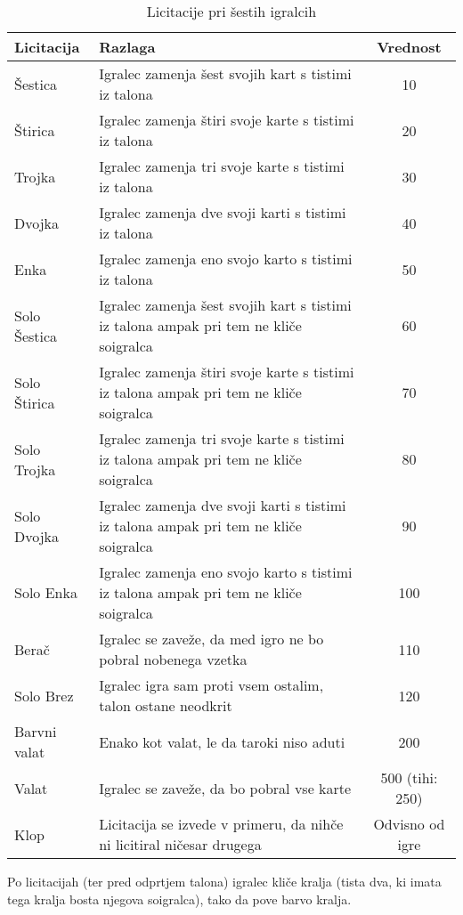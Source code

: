 \documentclass[a4paper, ]{report}
\begin{document}
\begin{table}
  \caption{Licitacije pri šestih igralcih}
  \begin{tabularx}{\textwidth}{lXc}
    \toprule
    \textbf{Licitacija} & \textbf{Razlaga} & \textbf{Vrednost} \\ \toprule
    Šestica & Igralec zamenja šest svojih kart s tistimi iz talona & 10 \\ \hline
    Štirica & Igralec zamenja štiri svoje karte s tistimi iz talona & 20 \\ \hline
    Trojka & Igralec zamenja tri svoje karte s tistimi iz talona & 30 \\ \hline
    Dvojka & Igralec zamenja dve svoji karti s tistimi iz talona & 40 \\ \hline
    Enka & Igralec zamenja eno svojo karto s tistimi iz talona & 50 \\ \hline
    Solo Šestica & Igralec zamenja šest svojih kart s tistimi iz talona ampak pri tem ne kliče soigralca & 60 \\ \hline
    Solo Štirica & Igralec zamenja štiri svoje karte s tistimi iz talona ampak pri tem ne kliče soigralca & 70 \\ \hline
    Solo Trojka & Igralec zamenja tri svoje karte s tistimi iz talona ampak pri tem ne kliče soigralca & 80 \\ \hline
    Solo Dvojka & Igralec zamenja dve svoji karti s tistimi iz talona ampak pri tem ne kliče soigralca & 90 \\ \hline
    Solo Enka & Igralec zamenja eno svojo karto s tistimi iz talona ampak pri tem ne kliče soigralca & 100 \\ \hline
    Berač & Igralec se zaveže, da med igro ne bo pobral nobenega vzetka & 110 \\ \hline
    Solo Brez & Igralec igra sam proti vsem ostalim, talon ostane neodkrit & 120 \\ \hline
    Barvni valat & Enako kot valat, le da taroki niso aduti & 200 \\ \hline
    Valat & Igralec se zaveže, da bo pobral vse karte & 500 (tihi: 250)\\ \hline
    Klop & Licitacija se izvede v primeru, da nihče ni licitiral ničesar drugega & Odvisno od igre \\ \bottomrule
  \end{tabularx}
\end{table}

Po licitacijah (ter pred odprtjem talona) igralec kliče kralja (tista dva, ki imata tega kralja bosta njegova soigralca), tako da pove barvo kralja.
\end{document}
